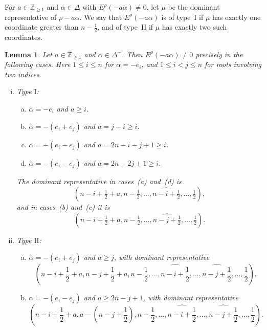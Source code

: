 \documentclass[11pt,a4paper]{amsart}
\newcommand{\ZZ}{\mathbb Z}
\theoremstyle{plain}
\newtheorem{lem}[theorem]{Lemma}
\numberwithin{equation}{section}
\def\geq{\geqslant}
\begin{document}
For \(a\in\ZZ_{\ge1}\) and \(\alpha\in\Delta\) with
\(E^\rho(-a\alpha)\ne0\), let \(\mu\) be the dominant representative
of \(\rho-a\alpha\).
We say that \(E^\rho(-a\alpha)\) is of type~\(\mathrm I\)
if \(\mu\) has exactly one coordinate greater than
\(n-\tfrac12\), and of type~\(\mathrm{II}\) if \(\mu\)
has exactly two such coordinates.
\begin{lem}\label{nonzero E criteria for B complex}
Let \(a\in\ZZ_{\ge1}\) and \(\alpha\in\Delta^-\).
Then \(E^\rho(-a\alpha)\ne0\) precisely in the following cases.
Here \(1\le i\le n\) for \(\alpha=-e_i\), and
\(1\le i<j\le n\) for roots involving two indices.
\begin{enumerate}[(i)]
	\item Type $\mathrm{I}$:
	\begin{enumerate}[(a)]
\item \(\alpha=-e_i\) and \(a\ge i\).
\item \(\alpha=-(e_i+e_j)\) and \(a=j-i\ge i\).
\item \(\alpha=-(e_i-e_j)\) and \(a=2n-i-j+1\ge i\).
\item \(\alpha=-(e_i-e_j)\) and \(a=2n-2j+1\ge i\).
\end{enumerate}
The dominant representative in cases~(a) and~(d) is
\[
(n-i+\tfrac12+a,n-\tfrac12,\dots,\widehat{n-i+\tfrac12},\dots,\tfrac12),
\]
and in cases~(b) and~(c) it is
\[
(n-i+\tfrac12+a,n-\tfrac12,\dots,\widehat{n-j+\tfrac12},\dots,\tfrac12).
\]

	\item Type $\mathrm{II}$:
	\begin{enumerate}[(a)]
		\item $\alpha=-(e_i+e_j)$ and $a\geq j$, with dominant representative
		\[
		(n-i+\frac12+a,n-j+\frac12+a,n-\frac12,\dots,\widehat{n-i+\frac12},\dots,\widehat{n-j+\frac12},\dots,\frac12).
		\]
		\item $\alpha=-(e_i-e_j)$ and $a\geq 2n-j+1$, with dominant representative
		\[
		(n-i+\frac12+a,a-(n-j+\frac12),n-\frac12,\dots,\widehat{n-i+\frac12},\dots,\widehat{n-j+\frac12},\dots,\frac12).
		\]
	\end{enumerate}
\end{enumerate}

\end{lem}
\end{document}
